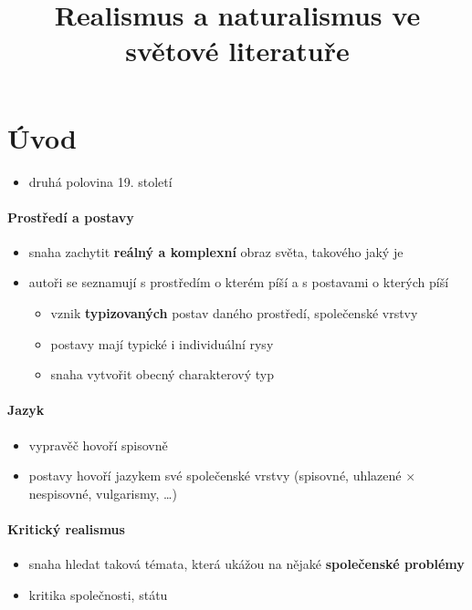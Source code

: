 \title{Realismus a naturalismus ve světové literatuře}


\section{Úvod}
\begin{itemize}
\item druhá polovina 19. století
\end{itemize}
\paragraph{Prostředí a postavy}
\begin{itemize}
\item snaha zachytit \textbf{reálný a komplexní} obraz světa, takového jaký je
\item autoři se seznamují s prostředím o kterém píší a s postavami o kterých píší
	\begin{itemize}
	\item[\ra] vznik \textbf{typizovaných} postav daného prostředí, společenské vrstvy
	\item postavy mají typické i individuální rysy
	\item snaha vytvořit obecný charakterový typ
	\end{itemize}
\end{itemize}

\paragraph{Jazyk}
\begin{itemize}
\item vypravěč hovoří spisovně
\item postavy hovoří jazykem své společenské vrstvy (spisovné, uhlazené $\times$ nespisovné, vulgarismy, \ldots)
\end{itemize}

\paragraph{Kritický realismus}
\begin{itemize}
\item snaha hledat taková témata, která ukážou na nějaké \textbf{společenské problémy}
\item kritika společnosti, státu
\end{itemize}

